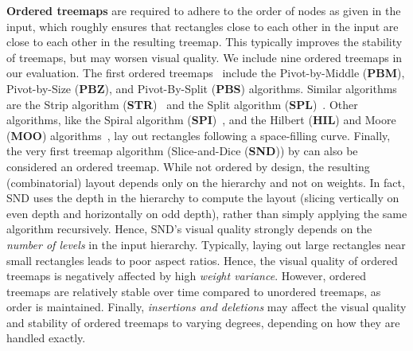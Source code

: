 \smallskip\noindent
\textbf{Ordered treemaps} are required to adhere to the order of nodes as given in the input, which roughly ensures that rectangles close to each other in the input are close to each other in the resulting treemap. This typically improves the stability of treemaps, but may worsen visual quality. We include nine ordered treemaps in our evaluation. The first ordered treemaps~\citep{ordered} include the Pivot-by-Middle (\textbf{PBM}), Pivot-by-Size (\textbf{PBZ}), and Pivot-By-Split (\textbf{PBS}) algorithms. Similar algorithms are the Strip algorithm (\textbf{STR})~\citep{bederson02} and the Split algorithm (\textbf{SPL})~\citep{engdahl}. Other algorithms, like the Spiral algorithm (\textbf{SPI})~\citep{spiral}, and the Hilbert (\textbf{HIL}) and Moore (\textbf{MOO}) algorithms~\citep{hilbert_moore}, lay out rectangles following a space-filling curve. Finally, the very first treemap algorithm (Slice-and-Dice (\textbf{SND})) by \cite{shneiderman92} can also be considered an ordered treemap. While not ordered by design, the resulting (combinatorial) layout depends only on the hierarchy and not on weights. In fact, SND uses the depth in the hierarchy to compute the layout (slicing vertically on even depth and horizontally on odd depth), rather than simply applying the same algorithm recursively. Hence, SND's visual quality strongly depends on the \emph{number of levels} in the input hierarchy. 
%
Typically, laying out large rectangles near small rectangles leads to poor aspect ratios. Hence, the visual quality of ordered treemaps is negatively affected by high \emph{weight variance}. However, ordered treemaps are relatively stable over time compared to unordered treemaps, as order is maintained. Finally, \emph{insertions and deletions} may affect the visual quality and stability of ordered treemaps to varying degrees, depending on how they are handled exactly.

